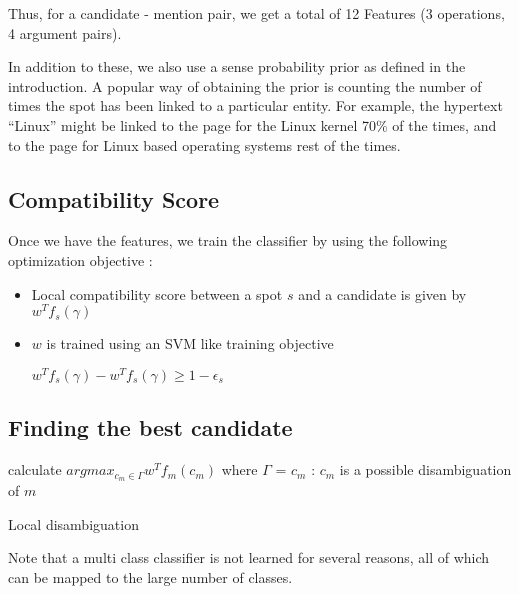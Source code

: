  Thus, for a candidate - mention pair, we get a total of 12 Features (3 operations, 4 argument pairs). 
 
 In addition to these, we also use a sense probability prior as defined in the introduction. A popular way of 
 obtaining the prior is counting the number of times the spot has been linked to a particular entity. For example, 
 the hypertext ``Linux'' might be linked to the page for the Linux kernel 70\% of the times, and to the page
 for Linux based operating systems rest of the times.
 
 
\subsection{Compatibility Score}
Once we have the features, we train the classifier by using the following optimization objective : 
\begin{itemize}
 \item Local compatibility score between a spot $s$ and a candidate is given by $w^{T}f_s(\gamma)$
 \item $w$ is trained using an SVM like training objective
 \begin{center} $w^{T}f_s(\gamma) - w^{T}f_s(\gamma) \geq 1 - \epsilon_s$ \end{center}
 \end{itemize}
 
 \subsection{Finding the best candidate}

 \begin{algorithm}[H]
  {
  calculate $argmax_{c_m \in \Gamma}w^{T}f_m(c_m)$
  where $\Gamma$ = $c_m$ : $c_m$ is a possible disambiguation of $m$
 }\caption{Local disambiguation}
\end{algorithm}

 Note that a multi class classifier is not learned for several reasons, all of which can be mapped to 
 the large number of classes. 